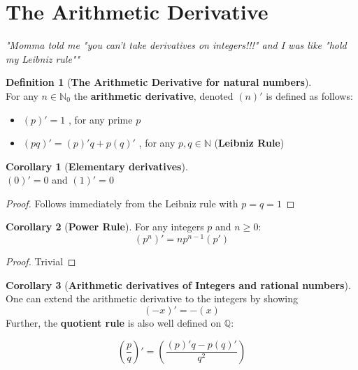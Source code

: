 \documentclass[12pt a]{article}
\author{Jair}
\theoremstyle{definition}
\newtheorem{corollary}{Corollary}
\newtheorem{definition}{Definition}
\theoremstyle{definition}
\theoremstyle{definition}
\begin{document}



\section{The Arithmetic Derivative}

\noindent
\textit{"Momma told me "you can't take derivatives on integers!!!" and I was like "hold my Leibniz rule""} 

\begin{definition}[\textbf{The Arithmetic Derivative for natural numbers}]
\phantom{} \\ 
For any $n \in \mathbb{N}_0$ the \textbf{arithmetic derivative}, denoted $(n)'$ is defined as follows: 
\begin{itemize}
	\item $(p)'=1$ , for any prime $p$
	\item $(pq)'= (p)'q + p(q)'$ , for any $p,q \in \mathbb{N}$ (\textbf{Leibniz Rule})
\end{itemize}

\end{definition}


\begin{corollary}[\textbf{Elementary derivatives}]
\phantom{} \\ 
$(0)'=0$ and $(1)'=0$
\end{corollary}

\begin{proof}
Follows immediately from the Leibniz rule with $p=q=1$
\end{proof}

\begin{corollary}[\textbf{Power Rule}]
For any integers $p$ and $n \geq 0$: 
$$
(p^n)'=np^{n-1}(p')
$$
\end{corollary}

\begin{proof}
Trivial
\end{proof}

\begin{corollary}[\textbf{Arithmetic derivatives of Integers and rational numbers}]
One can extend the arithmetic derivative to the integers by showing 
$$(-x)'=-(x)$$
Further, the \textbf{quotient rule} is also well defined on $\mathbb{Q}$: 

$$
\left(\frac{p}{q}\right)'
=
\left(\frac{(p)'q - p(q)'}{q^{2}}\right)
$$
\end{corollary}
\end{document}
